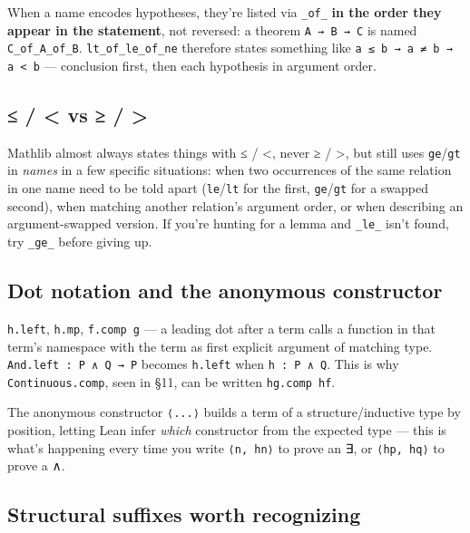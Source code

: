 When a name encodes hypotheses, they're listed via \texttt{\_of\_} \textbf{in the order they appear in the statement}, not reversed: a theorem \texttt{A → B → C} is named \texttt{C\_of\_A\_of\_B}. \texttt{lt\_of\_le\_of\_ne} therefore states something like \texttt{a ≤ b → a ≠ b → a < b} --- conclusion first, then each hypothesis in argument order.

\subsection{≤ / < vs ≥ / >}

Mathlib almost always states things with ≤ / <, never ≥ / >, but still uses \texttt{ge}/\texttt{gt} in \emph{names} in a few specific situations: when two occurrences of the same relation in one name need to be told apart (\texttt{le}/\texttt{lt} for the first, \texttt{ge}/\texttt{gt} for a swapped second), when matching another relation's argument order, or when describing an argument-swapped version. If you're hunting for a lemma and \texttt{\_le\_} isn't found, try \texttt{\_ge\_} before giving up.

\subsection{Dot notation and the anonymous constructor}

\texttt{h.left}, \texttt{h.mp}, \texttt{f.comp g} --- a leading dot after a term calls a function in that term's namespace with the term as first explicit argument of matching type. \texttt{And.left : P ∧ Q → P} becomes \texttt{h.left} when \texttt{h : P ∧ Q}. This is why \texttt{Continuous.comp}, seen in \S11, can be written \texttt{hg.comp hf}.

The anonymous constructor \texttt{⟨...⟩} builds a term of a structure/inductive type by position, letting Lean infer \emph{which} constructor from the expected type --- this is what's happening every time you write \texttt{⟨n, hn⟩} to prove an ∃, or \texttt{⟨hp, hq⟩} to prove a ∧.

\subsection{Structural suffixes worth recognizing}


